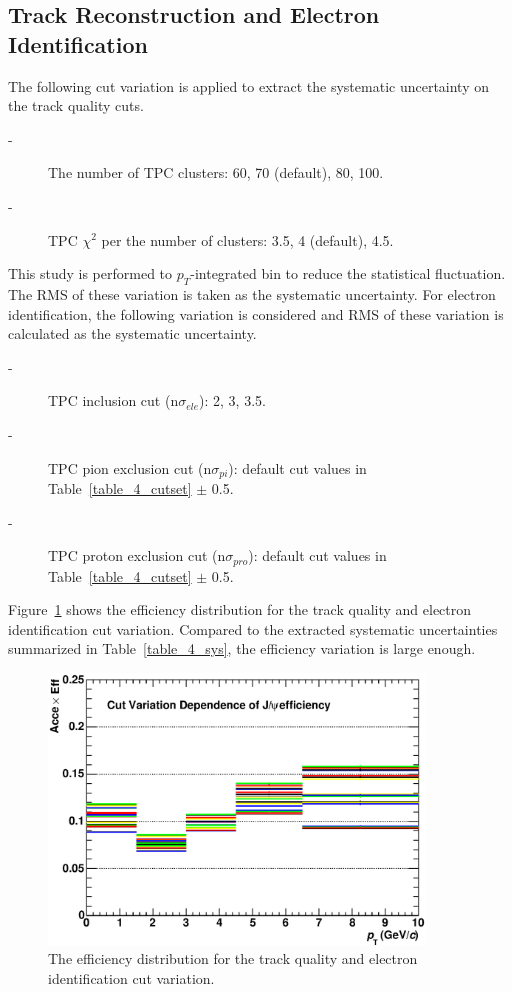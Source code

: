 \subsection{Track Reconstruction and Electron Identification}
The following cut variation is applied to extract the systematic uncertainty on the track quality cuts. 
\begin{description}
  \item[-] The number of TPC clusters: 60, 70 (default),  80, 100.
  \item[-] TPC $\chi^{2}$ per the number of clusters: 3.5, 4 (default), 4.5.
\end{description}
This study is performed to $p_{T}$-integrated bin to reduce the statistical fluctuation. 
The RMS of these variation is taken as the systematic uncertainty. 
For electron identification, the following variation is considered and RMS of these variation is calculated as the systematic uncertainty.
\begin{description}
  \item[-] TPC inclusion cut (n$\sigma_{ele}$): 2, 3, 3.5. 
  \item[-] TPC pion exclusion cut (n$\sigma_{pi}$): default cut values in Table~\ref{table_4_cutset} $\pm$ 0.5. 
  \item[-] TPC proton exclusion cut (n$\sigma_{pro}$): default cut values in Table~\ref{table_4_cutset} $\pm$ 0.5.
\end{description}
Figure~\ref{fig_4_cutvariation} shows the efficiency distribution for the track quality and electron identification cut variation. 
Compared to the extracted systematic uncertainties summarized in Table~\ref{table_4_sys}, the efficiency variation is large enough. 
\begin{figure}[!h]
	\centering
	 \includegraphics[width=10cm]{chap4/figure/Systematics/Variation/PIDCutVariationStudy_LHC13d10.eps}
	\caption{The efficiency distribution for the track quality and electron identification cut variation.  }
	\label{fig_4_cutvariation}
\end{figure}

